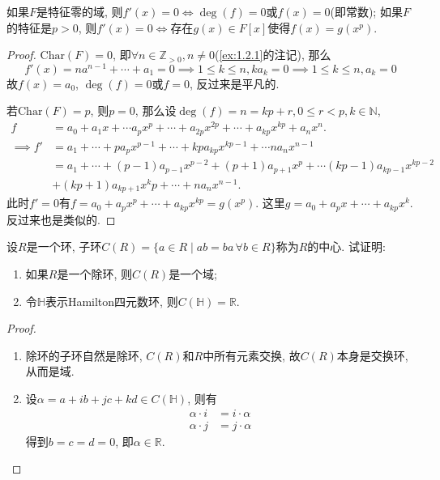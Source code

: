 \begin{problem}[*]\label{ex:2.1.10}
    如果$F$是特征零的域, 则$f'(x) = 0 \Leftrightarrow \deg(f) = 0$或$f(x) = 0$(即常数); 如果$F$的特征是$p > 0$, 则$f'(x) = 0 \Leftrightarrow$存在$g(x) \in F[x]$使得$f(x) = g(x^p)$.
\end{problem}

\begin{proof}
    $\mathrm{Char}(F) = 0$, 即$\forall n \in \mathbb{Z}_{>0}, n \neq 0$(\ref{ex:1.2.1}的注记), 那么
    \[
        f'(x) = na^{n - 1} + \cdots + a_1 = 0 \implies 1 \leqslant k \leqslant n, ka_k = 0 \implies 1 \leqslant k \leqslant n, a_k = 0
    \]
    故$f(x) = a_0$, $\deg(f) = 0$或$f = 0$, 反过来是平凡的.

    若$\mathrm{Char}(F) = p$, 则$p = 0$, 那么设$\deg(f) = n = kp + r, 0 \leqslant r < p, k \in \mathbb{N}$,
    \[
    \begin{aligned}
        f &= a_0 + a_1x + \cdots a_px^p + \cdots + a_{2p}x^{2p} + \cdots + a_{kp}x^{kp} + a_nx^n.\\
        \implies f' &= a_1 + \cdots + pa_px^{p - 1} + \cdots + kpa_{kp}x^{kp - 1} + \cdots na_nx^{n - 1}\\
        &= a_1 + \cdots + (p - 1)a_{p - 1}x^{p - 2} + (p + 1)a_{p + 1}x^p + \cdots (kp - 1)a_{kp - 1}x^{kp - 2}\\
        &+ (kp + 1)a_{kp + 1}x^kp + \cdots + na_nx^{n - 1}.
    \end{aligned}
    \]
    此时$f' = 0$有$f = a_0 + a_px^p + \cdots + a_{kp}x^{kp} = g(x^p)$. 这里$g = a_0 + a_px + \cdots + a_{kp}x^k$. 反过来也是类似的.
\end{proof}

\begin{problem}\label{ex:2.1.11}
    设$R$是一个环, 子环$C(R) = \{a \in R \mid ab = ba\, \forall b \in R\}$称为$R$的中心. 试证明:
    \begin{enumerate}[(1)]
        \item 如果$R$是一个除环, 则$C(R)$是一个域;
        \item 令$\mathbb{H}$表示Hamilton四元数环, 则$C(\mathbb{H}) = \mathbb{R}$.
    \end{enumerate}
\end{problem}

\begin{proof}
    \begin{enumerate}[(1)]
        \item 除环的子环自然是除环, $C(R)$和$R$中所有元素交换, 故$C(R)$本身是交换环, 从而是域.
        \item 设$\alpha = a + ib + jc + kd \in C(\mathbb{H})$, 则有
        \[
        \begin{aligned}
            \alpha \cdot i &= i \cdot \alpha\\
            \alpha \cdot j &= j \cdot \alpha
        \end{aligned}
        \]
        得到$b = c = d = 0$, 即$\alpha \in \mathbb{R}$.
    \end{enumerate}
\end{proof}

